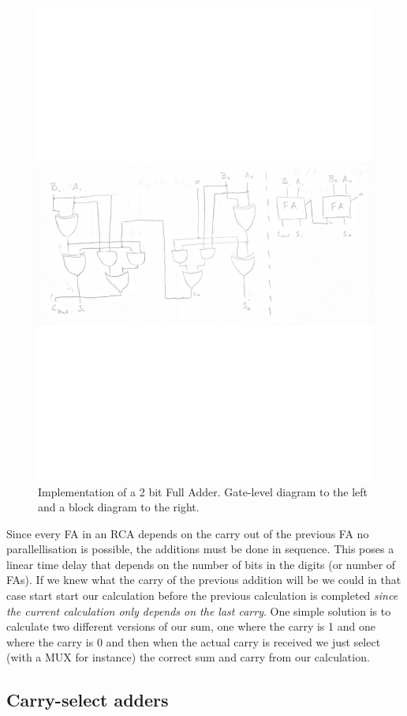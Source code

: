 \documentclass[a4paper,11pt]{report}
\begin{document}
\begin{figure}[H]
  \centering
  \includegraphics[width=.8\textwidth,trim={0 10cm 0 10cm}]{images/2b-FA.pdf}
  \caption{Implementation of a 2 bit Full Adder. Gate-level diagram to the left and a block diagram to the right.}
  \label{fig:2fa}
\end{figure}

Since every FA in an RCA depends on the carry out of the previous FA
no parallellisation is possible, the additions must be done in
sequence. This poses a linear time delay that depends on the number of
bits in the digits (or number of FAs). If we knew what the carry of
the previous addition will be we could in that case start start our
calculation before the previous calculation is completed \textit{since
  the current calculation only depends on the last carry}. One simple
solution is to calculate two different versions of our sum, one where
the carry is 1 and one where the carry is 0 and then when the actual
carry is received we just select (with a MUX for instance) the correct
sum and carry from our calculation.

\subsection{Carry-select adders}
\end{document}
